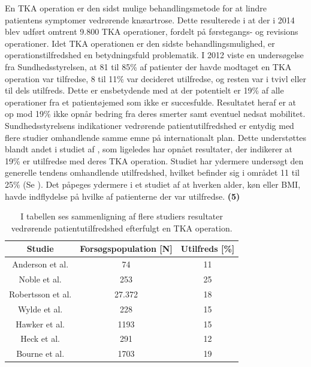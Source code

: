 En TKA operation er den sidst mulige behandlingsmetode for at lindre patientens symptomer vedrørende knæartrose. Dette resulterede i at der i 2014 blev udført omtrent 9.800 TKA operationer, fordelt på førstegangs- og revisions operationer. \citep{aarsrapport2016} Idet TKA operationen er den sidste behandlingsmulighed, er operationstilfredshed en betydningsfuld problematik. I 2012 viste en undersøgelse fra Sundhedsstyrelsen, at 81 til 85\% af patienter der havde modtaget en TKA operation var tilfredse, 8 til 11\% var decideret utilfredse, og resten var i tvivl eller til dels utilfreds. Dette er ensbetydende med at der potentielt er 19\% af alle operationer fra et patientøjemed som ikke er succesfulde. Resultatet heraf er at op mod 19\% ikke opnår bedring fra deres smerter samt eventuel nedsat mobilitet. \citep{brostrom2012} Sundhedsstyrelsens indikationer vedrørende patientutilfredshed er entydig med flere studier omhandlende samme emne på internationalt plan. Dette understøttes blandt andet i studiet af \cite{Bourne2010}, som ligeledes har opnået resultater, der indikerer at 19\% er utilfredse med deres TKA operation. Studiet har ydermere undersøgt den generelle tendens omhandlende utilfredshed, hvilket befinder sig i området 11 til 25\% (Se ). \citep{Bourne2010} Det påpeges ydermere i et studiet af \cite{Jacobs2014} at hverken alder, køn eller BMI, havde indflydelse på hvilke af patienterne der var utilfredse. \citep{Jacobs2014}   \textbf{(5)}
\begin{table}[H]
	\centering
\begin{tabular}{ccc}
	\hline
	\rowcolor[HTML]{C0C0C0} 
	Studie            & Forsøgspopulation {[}N{]} & Utilfreds {[}\%{]} \\ \hline
	Anderson et al.   & 74                        & 11                 \\
	Noble et al.      & 253                       & 25                 \\
	Robertsson et al. & 27.372                    & 18                 \\
	Wylde et al.      & 228                       & 15                 \\
	Hawker et al.     & 1193                      & 15                 \\
	Heck et al.       & 291                       & 12                 \\
	Bourne et al.     & 1703                      & 19                 \\ \hline
\end{tabular}
	\caption{I tabellen ses \cite{Bourne2010} sammenligning af flere studiers resultater vedrørende patientutilfredshed efterfulgt en TKA operation. \citep{Bourne2010}}
	\label{tab:patient_utilfreds}
\end{table}

